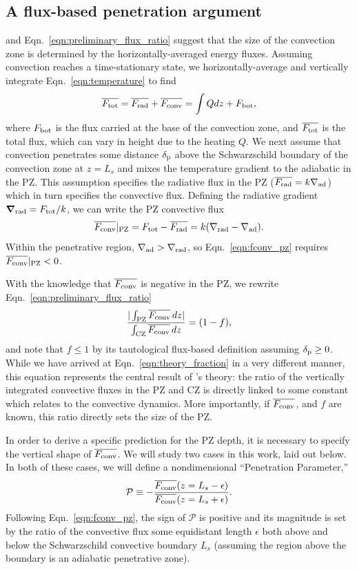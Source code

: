 \documentclass{aastex631}
\newcommand{\gradrad}{\ensuremath{\nabla_{\rm{rad}}}}
\newcommand{\gradad}{\ensuremath{\nabla_{\rm{ad}}}}
\newcommand{\delp}{\ensuremath{\delta_{\rm{p}}}}
\newcommand{\Fbot}{\ensuremath{F_{\rm{bot}}}}
\newcommand{\Ftot}{\ensuremath{F_{\rm{tot}}}}
\newcommand{\Frad}{\ensuremath{F_{\rm{rad}}}}
\newcommand{\Fconv}{\ensuremath{F_{\rm{conv}}}}
\newcommand{\mP}{\ensuremath{\mathcal{P}}}
\renewcommand{\vec}[1]{\boldsymbol{#1}}
\renewcommand{\bar}[1]{\overline{#1}}
\newcommand{\grad}{\vec{\nabla}}
\begin{document}
\subsection{A flux-based penetration argument}
\citet{zahn1991} and Eqn.~\ref{eqn:preliminary_flux_ratio} suggest that the size of the convection zone is determined by the horizontally-averaged energy fluxes.
Assuming convection reaches a time-stationary state, we horizontally-average and vertically integrate Eqn.~\ref{eqn:temperature} to find
\begin{equation}
\overline{\Ftot} = \overline{\Frad} + \overline{\Fconv} = \int Q dz + \Fbot,
\end{equation}
where $\Fbot$ is the flux carried at the base of the convection zone, and $\overline{\Ftot}$ is the total flux, which can vary in height due to the heating $Q$.
We next assume that convection penetrates some distance $\delp$ above the Schwarzschild boundary of the convection zone at $z = L_s$ and mixes the temperature gradient to the adiabatic in the PZ.
This assumption specifies the radiative flux in the PZ ($\bar{\Frad} = k\gradad$) which in turn specifies the convective flux.
Defining the radiative gradient $\grad_{\rm{rad}} = \Ftot/k$, we can write the PZ convective flux
\begin{equation}
\overline{\Fconv}|_{\rm{PZ}} = \Ftot - \overline{\Frad} = k(\gradrad - \gradad).
\label{eqn:fconv_pz}
\end{equation}
Within the penetrative region, $\gradad > \gradrad$, so Eqn.~\ref{eqn:fconv_pz} requires $\overline{\Fconv}|_{\rm{PZ}} < 0$.

With the knowledge that $\bar{\Fconv}$ is negative in the PZ, we rewrite Eqn.~\ref{eqn:preliminary_flux_ratio}
\begin{equation}
\frac{|\int_{\rm{PZ}}\bar{\Fconv}\,dz|}{\int_{\rm{CZ}}\bar{\Fconv}\,dz} = (1 - f),
\label{eqn:theory_fraction}
\end{equation}
and note that $f \leq 1$ by its tautological flux-based definition assuming $\delp \geq 0$.
While we have arrived at Eqn.~\ref{eqn:theory_fraction} in a very different manner, this equation represents the central result of \citet{zahn1991}'s theory: the ratio of the vertically integrated convective fluxes in the PZ and CZ is directly linked to some constant which relates to the convective dynamics.
More importantly, if $\bar{\Fconv}$, and $f$ are known, this ratio directly sets the size of the PZ.

In order to derive a specific prediction for the PZ depth, it is necessary to specify the vertical shape of $\overline{\Fconv}$.
We will study two cases in this work, laid out below.
In both of these cases, we will define a nondimensional ``Penetration Parameter,''
\begin{equation}
\mP \equiv -\frac{\overline{\Fconv}(z = L_s - \epsilon)}{\overline{\Fconv}(z = L_s + \epsilon)}.
\label{eqn:theory_P_defn}
\end{equation}
Following Eqn.~\ref{eqn:fconv_pz}, the sign of $\mP$ is positive and its magnitude is set by the ratio of the convective flux some equidistant length $\epsilon$ both above and below the Schwarzschild convective boundary $L_s$ (assuming the region above the boundary is an adiabatic penetrative zone).
\end{document}
